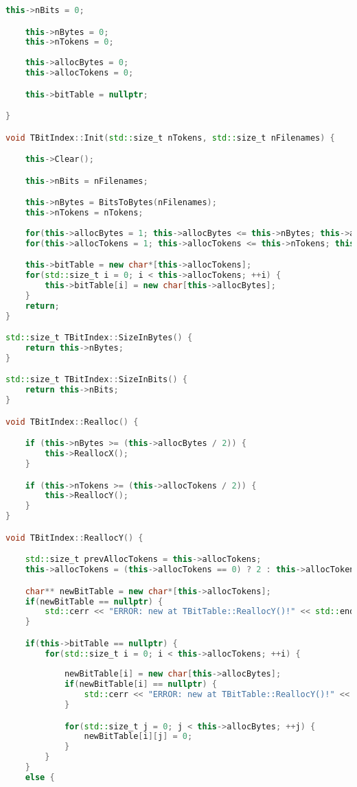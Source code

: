 \begin{lstlisting}[language=C++]
    this->nBits = 0;

    this->nBytes = 0;
    this->nTokens = 0;
    
    this->allocBytes = 0;
    this->allocTokens = 0;

    this->bitTable = nullptr;

}

void TBitIndex::Init(std::size_t nTokens, std::size_t nFilenames) {

    this->Clear();

    this->nBits = nFilenames;

    this->nBytes = BitsToBytes(nFilenames);
    this->nTokens = nTokens;
    
    for(this->allocBytes = 1; this->allocBytes <= this->nBytes; this->allocBytes *= 2);
    for(this->allocTokens = 1; this->allocTokens <= this->nTokens; this->allocTokens *= 2);

    this->bitTable = new char*[this->allocTokens];
    for(std::size_t i = 0; i < this->allocTokens; ++i) {
        this->bitTable[i] = new char[this->allocBytes];
    }
    return;
}

std::size_t TBitIndex::SizeInBytes() {
    return this->nBytes;
}

std::size_t TBitIndex::SizeInBits() {
    return this->nBits;
}

void TBitIndex::Realloc() {

    if (this->nBytes >= (this->allocBytes / 2)) {
        this->ReallocX();
    }

    if (this->nTokens >= (this->allocTokens / 2)) {
        this->ReallocY();
    }
}

void TBitIndex::ReallocY() {

    std::size_t prevAllocTokens = this->allocTokens;
    this->allocTokens = (this->allocTokens == 0) ? 2 : this->allocTokens * 2;

    char** newBitTable = new char*[this->allocTokens];
    if(newBitTable == nullptr) {
        std::cerr << "ERROR: new at TBitTable::ReallocY()!" << std::endl;
    }

    if(this->bitTable == nullptr) {
        for(std::size_t i = 0; i < this->allocTokens; ++i) {
            
            newBitTable[i] = new char[this->allocBytes];
            if(newBitTable[i] == nullptr) {
                std::cerr << "ERROR: new at TBitTable::ReallocY()!" << std::endl;
            }

            for(std::size_t j = 0; j < this->allocBytes; ++j) {
                newBitTable[i][j] = 0;
            }
        }
    }
    else {
        

\end{lstlisting}
